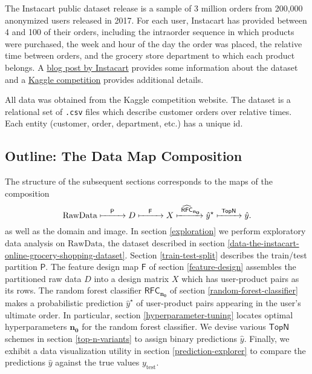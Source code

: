 \documentclass[11pt]{article}
\theoremstyle{definition}
\numberwithin{equation}{section}
\begin{document}
The Instacart public dataset release is a sample of 3 million orders
from 200,000 anonymized users released in 2017. For each user, Instacart
has provided between 4 and 100 of their orders, including the intraorder
sequence in which products were purchased, the week and hour of the day
the order was placed, the relative time between orders, and the grocery
store department to which each product belongs. A
\href{https://tech.instacart.com/3-million-instacart-orders-open-sourced-d40d29ead6f2}{blog
  post by Instacart} provides some information about the dataset and a
\href{https://www.kaggle.com/c/instacart-market-basket-analysis/overview}{Kaggle
  competition} provides additional details.

All data was obtained from the Kaggle competition website. The dataset
is a relational set of \texttt{.csv} files which describe customer orders over
relative times. Each entity (customer, order, department, etc.) has a
unique id.


\hypertarget{outline-the-data-map-composition}{%
  \subsection{Outline: The Data Map Composition
}\label{outline-the-data-map-composition}}

The structure of the subsequent sections corresponds to the maps
of the composition 
\begin{equation}
\mathrm{RawData}
\xmapsto{\quad \mathsf{P} \quad }
D 
\xmapsto{\quad \mathsf{F}\quad }
X
\xmapsto{\ \operatorname{\widehat{\mathsf{RFC}}}_\mathbf{n_0} }
\hat{y}^\star
\xmapsto{\ \mathsf{TopN}\ }
\hat{y}.
\end{equation}
as well as the domain and image.
In section \ref{exploration} we perform exploratory data analysis on $\mathrm{RawData}$,
the dataset described in section \ref{data-the-instacart-online-grocery-shopping-dataset}.
Section \ref{train-test-split} describes the train/test partition $\mathsf{P}$.
The feature design map $\mathsf{F}$ of section \ref{feature-design}
assembles the partitioned raw data $D$ into a design matrix $X$
which has user-product pairs as its rows. The random forest classifier
$\mathsf{RFC}_{\mathbf{n_0}}$ of section \ref{random-forest-classifier}
makes a probabilistic prediction $\hat{y}^\star$ of
user-product pairs appearing in the user's ultimate order.
In particular, section \ref{hyperparameter-tuning} locates optimal hyperparameters
$\mathbf{n_0}$ for the random forest classifier.
We devise various $\mathsf{TopN}$ schemes in section \ref{top-n-variants}
to assign binary predictions $\hat{y}$.
Finally, we exhibit a data visualization utility in section \ref{prediction-explorer} 
to compare the predictions $\hat{y}$ against the true values $y_\text{test}$.
\end{document}

